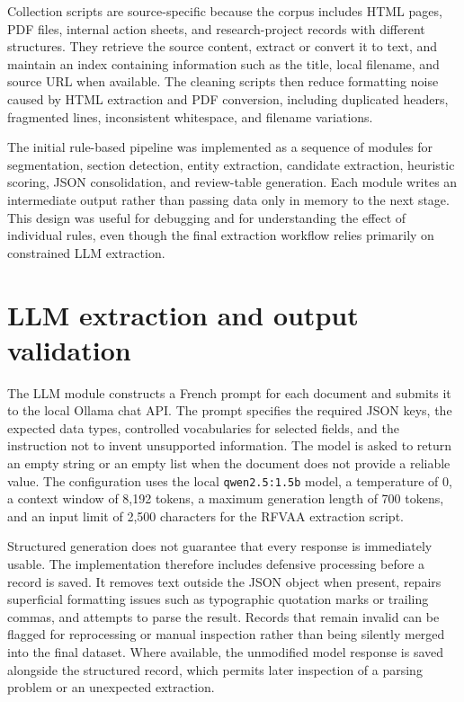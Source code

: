 \documentclass[
11pt,
english,
singlespacing,
headsepline,
]{MastersDoctoralThesis}
\begin{document}
Collection scripts are source-specific because the corpus includes HTML pages,
PDF files, internal action sheets, and research-project records with different
structures. They retrieve the source content, extract or convert it to text,
and maintain an index containing information such as the title, local filename,
and source URL when available. The cleaning scripts then reduce formatting noise
caused by HTML extraction and PDF conversion, including duplicated headers,
fragmented lines, inconsistent whitespace, and filename variations.

The initial rule-based pipeline was implemented as a sequence of modules for
segmentation, section detection, entity extraction, candidate extraction,
heuristic scoring, JSON consolidation, and review-table generation. Each module
writes an intermediate output rather than passing data only in memory to the
next stage. This design was useful for debugging and for understanding the
effect of individual rules, even though the final extraction workflow relies
primarily on constrained LLM extraction.

\section{LLM extraction and output validation}

The LLM module constructs a French prompt for each document and submits it to
the local Ollama chat API. The prompt specifies the required JSON keys, the
expected data types, controlled vocabularies for selected fields, and the
instruction not to invent unsupported information. The model is asked to return
an empty string or an empty list when the document does not provide a reliable
value. The configuration uses the local \texttt{qwen2.5:1.5b} model, a
temperature of 0, a context window of 8,192 tokens, a maximum generation length
of 700 tokens, and an input limit of 2,500 characters for the RFVAA extraction
script.

Structured generation does not guarantee that every response is immediately
usable. The implementation therefore includes defensive processing before a
record is saved. It removes text outside the JSON object when present, repairs
superficial formatting issues such as typographic quotation marks or trailing
commas, and attempts to parse the result. Records that remain invalid can be
flagged for reprocessing or manual inspection rather than being silently merged
into the final dataset. Where available, the unmodified model response is saved
alongside the structured record, which permits later inspection of a parsing
problem or an unexpected extraction.
\end{document}
